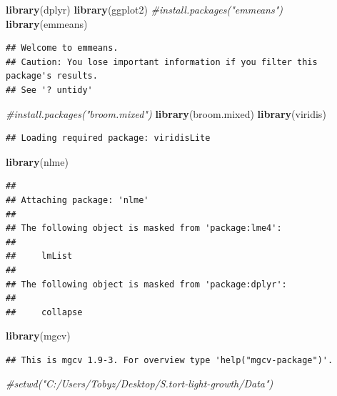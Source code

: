 \documentclass[
]{article}
\newenvironment{Shaded}{\begin{snugshade}}{\end{snugshade}}
\newcommand{\CommentTok}[1]{\textcolor[rgb]{0.56,0.35,0.01}{\textit{#1}}}
\newcommand{\FunctionTok}[1]{\textcolor[rgb]{0.13,0.29,0.53}{\textbf{#1}}}
\newcommand{\NormalTok}[1]{#1}
\begin{document}
\begin{Shaded}
\begin{Highlighting}[]
\FunctionTok{library}\NormalTok{(dplyr)}
\FunctionTok{library}\NormalTok{(ggplot2)}
\CommentTok{\#install.packages("emmeans")}
\FunctionTok{library}\NormalTok{(emmeans)      }
\end{Highlighting}
\end{Shaded}

\begin{verbatim}
## Welcome to emmeans.
## Caution: You lose important information if you filter this package's results.
## See '? untidy'
\end{verbatim}

\begin{Shaded}
\begin{Highlighting}[]
\CommentTok{\#install.packages("broom.mixed")}
\FunctionTok{library}\NormalTok{(broom.mixed)  }
\FunctionTok{library}\NormalTok{(viridis)      }
\end{Highlighting}
\end{Shaded}

\begin{verbatim}
## Loading required package: viridisLite
\end{verbatim}

\begin{Shaded}
\begin{Highlighting}[]
\FunctionTok{library}\NormalTok{(nlme)         }
\end{Highlighting}
\end{Shaded}

\begin{verbatim}
## 
## Attaching package: 'nlme'
## 
## The following object is masked from 'package:lme4':
## 
##     lmList
## 
## The following object is masked from 'package:dplyr':
## 
##     collapse
\end{verbatim}

\begin{Shaded}
\begin{Highlighting}[]
\FunctionTok{library}\NormalTok{(mgcv)         }
\end{Highlighting}
\end{Shaded}

\begin{verbatim}
## This is mgcv 1.9-3. For overview type 'help("mgcv-package")'.
\end{verbatim}

\begin{Shaded}
\begin{Highlighting}[]
\CommentTok{\#setwd("C:/Users/Tobyz/Desktop/S.tort{-}light{-}growth/Data")}
\end{Highlighting}
\end{Shaded}
\end{document}
